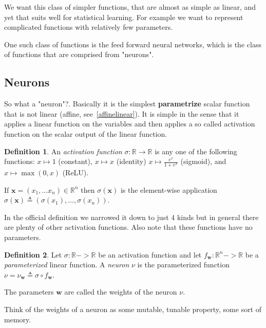 \documentclass[11pt, a4paper]{report}
\theoremstyle{plain}
\theoremstyle{definition}
\newtheorem{mydef}{Definition}[chapter]
\theoremstyle{remark}
\newcommand{\R}{\mathbb{R}}
\newcommand{\x}{\mathbf{x}}
\newcommand{\w}{\mathbf{w}}
\begin{document}
We want this class of simpler functions, that are almost as simple as linear,
and yet that suits well for statistical learning. For example we want to
represent complicated functions with relatively few parameters.

One such class of functions is the feed forward neural networks,
which is the class of functions that are comprised from "neurons".

\subsection{Neurons}

So what a "neuron"?. Basically it is the simplest \textbf{parametrize}
scalar function that is not linear (affine, see~\ref{affinelinear}).
It is simple in the sense that it applies a
linear function on the variables and then applies a so called activation
function on the scalar output of the linear function.

\begin{mydef}
\label{def:activationfunction}
An \emph{activation function} $\sigma : \R \to \R$ is any one of the following functions:
$x \mapsto 1$ (constant), $x \mapsto x$ (identity)
$ x \mapsto \frac{e^x}{1 + e^x}$ (sigmoid), and $x \mapsto \max(0,x)$ (ReLU).

If $\x = (x_1, \dots x_n) \in \R^n$ then $\sigma(\x)$ is the element-wise application
$\sigma(\x) \triangleq (\sigma(x_1), \dots , \sigma(x_n))$.
\end{mydef}

In the official definition we narrowed it down to just 4 kinds but in general
there are plenty of other activation functions. Also note that these functions
have no parameters.

\begin{mydef}
\label{def:neuron}
Let $\sigma : \R -> \R$ be an activation function and let $f_{\w} : \R^n -> \R$
be a \emph{parameterized} linear function. A \emph{neuron} $\nu$ is the
parameterized function 
$\nu =  \nu_{\w} \triangleq \sigma \circ
f_{\w}$.

The parameters $\w$ are called the weights of the neuron $\nu$.
\end{mydef}

Think of the weights of a neuron as some mutable, tunable property, some sort of memory.
\end{document}
